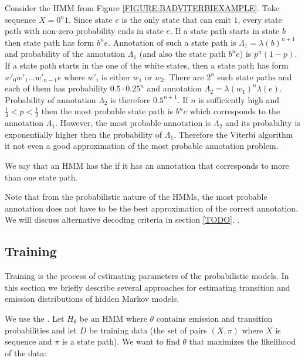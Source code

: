 \begin{example} 
Consider the HMM from Figure \ref{FIGURE:BADVITERBIEXAMPLE}. Take sequence
$X=0^n1$.  Since state $e$ is the only state that can emit $1$, every state
path with non-zero probability ends in state $e$. If a state path starts in
state $b$ then state path has form $b^ne$. Annotation of such a state path is
$\Lambda_1=\lambda(b)^{n+1}$ and probability of the annotation $\Lambda_1$ (and
also the state path $b^ne$) is $p^n(1-p)$.  If a state path starts in the one
of the white states, then a state path has form $w'_0w'_1\dots w'_{n-1}e$ where
$w'_i$ is either $w_1$ or $w_2$.  There are $2^n$ such state paths and each of
them has probability $0.5\cdot 0.25^n$ and annotation
$\Lambda_2=\lambda(w_1)^n\lambda(e)$. Probability of annotation $\Lambda_2$ is
therefore $0.5^{n+1}$.  If $n$ is sufficiently high and $\frac14<p<\frac12$
then the most probable state path is $b^ne$ which corresponds to the annotation
$\Lambda_1$. However, the most probable annotation is $\Lambda_2$ and its
probability is exponentially higher then the probability of $\Lambda_1$.
Therefore the Viterbi algorithm it not even a good approximation of the most
probable annotation problem.

We say that an HMM has the  if it has an
annotation that corresponds to more than one state path.
\end{example}


Note that from the probabilistic nature of the HMMs, the most probable
annotation does not have to be the best approximation of the correct annotation.
We will discuss alternative decoding criteria in section \ref{TODO}.
\nocite{Brown2010,Gross2007,Nanasi2010,Truszkowski2011}.


\subsection{Training} 

Training is the process of estimating parameters of the probabilistic models. In this
section we briefly describe several approaches for estimating transition and
emission distributions of hidden Markov models.

We use the . Let $H_{\theta}$ be an HMM
where $\theta$ contains emission and transition probabilities and
let $D$ be training data (the set of pairs $(X,\pi)$ where $X$ is sequence and $\pi$ is a state path).  We
want to find $\theta$ that maximizes the likelihood of the data:

